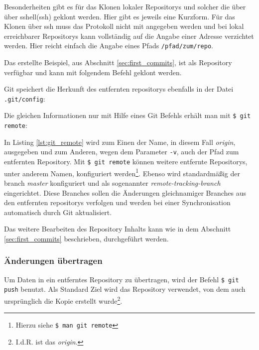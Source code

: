 
Besonderheiten gibt es für das Klonen lokaler Repositorys und solcher die über
über \gls{sshell}(\acrshort{ssh}) geklont werden. Hier gibt es jeweils eine
Kurzform. Für das Klonen über \acrshort{ssh} muss das Protokoll nicht mit
angegeben werden und bei lokal erreichbarer Repositorys kann vollständig auf
die Angabe einer Adresse verzichtet werden. Hier reicht einfach die Angabe
eines Pfads \texttt{/pfad/zum/repo}.

Das erstellte Beispiel, aus Abschnitt \ref{sec:first_commits}, ist als
Repository verfügbar und kann mit folgendem Befehl geklont werden.


Git speichert die Herkunft des entfernten \glspl{repository} ebenfalls in der
Datei \texttt{.git/config}:


Die gleichen Informationen nur mit Hilfe eines Git Befehls erhält man mit
\texttt{\$ git remote}:


In Listing \ref{lst:git_remote} wird zum Einen der Name, in diesem Fall
\textit{origin}, ausgegeben und zum Anderen, wegen dem Parameter \texttt{-v},
auch der Pfad zum entfernten Repository. Mit \texttt{\$ git remote} können
weitere entfernte Repositorys, unter anderem Namen, konfiguriert
werden\footnote{Hierzu siehe \texttt{\$ man git remote}}. Ebenso wird
standardmäßig der \gls{branch} \textit{master} konfiguriert und als sogenannter
\textit{remote-tracking-branch} eingerichtet. Diese Branches sollen die
Änderungen gleichnamiger Branches aus den entfernten \glspl{repository}
verfolgen und werden bei einer Synchronisation automatisch durch Git
aktualisiert.\cite[S.~141-143]{gitosp}

Das weitere Bearbeiten des Repository Inhalts kann wie in dem Abschnitt
\ref{sec:first_commits} beschrieben, durchgeführt werden.

\subsubsection{Änderungen übertragen}
Um Daten in ein entferntes Repository zu übertragen, wird der Befehl \texttt{\$
git push} benutzt. Als Standard Ziel wird das Repository verwendet, von dem auch
ursprünglich die Kopie erstellt wurde\footnote{I.d.R. ist das \textit{origin}.}.

